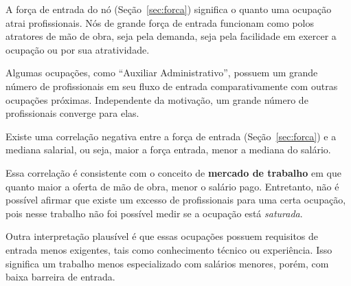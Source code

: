\documentclass[12pt,a4paper,final]{article}
\begin{document}
\begin{hypothesis}
    A força de entrada do nó (Seção~\ref{sec:forca}) significa o quanto uma ocupação atrai profissionais. Nós de grande força de entrada funcionam como polos atratores de mão de obra, seja pela demanda, seja pela facilidade em exercer a ocupação ou por sua atratividade.
\end{hypothesis}

Algumas ocupações, como \enquote{Auxiliar Administrativo}, possuem um grande número de profissionais em seu fluxo de entrada comparativamente com outras ocupações próximas. Independente da motivação, um grande número de profissionais converge para elas.

\begin{hypothesis}
    Existe uma correlação negativa entre a força de entrada (Seção~\ref{sec:forca}) e a mediana salarial, ou seja, maior a força entrada, menor a mediana do salário.
\end{hypothesis}


Essa correlação é consistente com o conceito de \textbf{mercado de trabalho} em que quanto maior a oferta de mão de obra, menor o salário pago. Entretanto, não é possível afirmar que existe um excesso de profissionais para uma certa ocupação, pois nesse trabalho não foi possível medir se a ocupação está \textit{saturada}.

Outra interpretação plausível é que essas ocupações possuem requisitos de entrada menos exigentes, tais como conhecimento técnico ou experiência. Isso significa um trabalho menos especializado com salários menores, porém, com baixa barreira de entrada.

\end{document}
